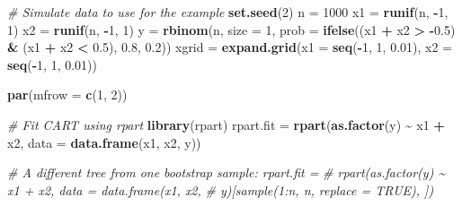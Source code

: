 \documentclass[
]{book}
\newenvironment{Shaded}{\begin{snugshade}}{\end{snugshade}}
\newcommand{\AttributeTok}[1]{\textcolor[rgb]{0.13,0.29,0.53}{#1}}
\newcommand{\CommentTok}[1]{\textcolor[rgb]{0.56,0.35,0.01}{\textit{#1}}}
\newcommand{\DecValTok}[1]{\textcolor[rgb]{0.00,0.00,0.81}{#1}}
\newcommand{\FloatTok}[1]{\textcolor[rgb]{0.00,0.00,0.81}{#1}}
\newcommand{\FunctionTok}[1]{\textcolor[rgb]{0.13,0.29,0.53}{\textbf{#1}}}
\newcommand{\NormalTok}[1]{#1}
\newcommand{\OtherTok}[1]{\textcolor[rgb]{0.56,0.35,0.01}{#1}}
\newcommand{\SpecialCharTok}[1]{\textcolor[rgb]{0.81,0.36,0.00}{\textbf{#1}}}
\begin{document}
\begin{Shaded}
\begin{Highlighting}[]
\CommentTok{\# Simulate data to use for the example}
\FunctionTok{set.seed}\NormalTok{(}\DecValTok{2}\NormalTok{)}
\NormalTok{n }\OtherTok{=} \DecValTok{1000}
\NormalTok{x1 }\OtherTok{=} \FunctionTok{runif}\NormalTok{(n, }\SpecialCharTok{{-}}\DecValTok{1}\NormalTok{, }\DecValTok{1}\NormalTok{)}
\NormalTok{x2 }\OtherTok{=} \FunctionTok{runif}\NormalTok{(n, }\SpecialCharTok{{-}}\DecValTok{1}\NormalTok{, }\DecValTok{1}\NormalTok{)}
\NormalTok{y }\OtherTok{=} \FunctionTok{rbinom}\NormalTok{(n, }\AttributeTok{size =} \DecValTok{1}\NormalTok{, }\AttributeTok{prob =} \FunctionTok{ifelse}\NormalTok{((x1 }\SpecialCharTok{+}\NormalTok{ x2 }\SpecialCharTok{\textgreater{}} \SpecialCharTok{{-}}\FloatTok{0.5}\NormalTok{) }\SpecialCharTok{\&}\NormalTok{ (x1 }\SpecialCharTok{+}
\NormalTok{    x2 }\SpecialCharTok{\textless{}} \FloatTok{0.5}\NormalTok{), }\FloatTok{0.8}\NormalTok{, }\FloatTok{0.2}\NormalTok{))}
\NormalTok{xgrid }\OtherTok{=} \FunctionTok{expand.grid}\NormalTok{(}\AttributeTok{x1 =} \FunctionTok{seq}\NormalTok{(}\SpecialCharTok{{-}}\DecValTok{1}\NormalTok{, }\DecValTok{1}\NormalTok{, }\FloatTok{0.01}\NormalTok{), }\AttributeTok{x2 =} \FunctionTok{seq}\NormalTok{(}\SpecialCharTok{{-}}\DecValTok{1}\NormalTok{, }\DecValTok{1}\NormalTok{, }\FloatTok{0.01}\NormalTok{))}

\FunctionTok{par}\NormalTok{(}\AttributeTok{mfrow =} \FunctionTok{c}\NormalTok{(}\DecValTok{1}\NormalTok{, }\DecValTok{2}\NormalTok{))}

\CommentTok{\# Fit CART using rpart}
\FunctionTok{library}\NormalTok{(rpart)}
\NormalTok{rpart.fit }\OtherTok{=} \FunctionTok{rpart}\NormalTok{(}\FunctionTok{as.factor}\NormalTok{(y) }\SpecialCharTok{\textasciitilde{}}\NormalTok{ x1 }\SpecialCharTok{+}\NormalTok{ x2, }\AttributeTok{data =} \FunctionTok{data.frame}\NormalTok{(x1,}
\NormalTok{    x2, y))}

\CommentTok{\# A different tree from one bootstrap sample: rpart.fit =}
\CommentTok{\# rpart(as.factor(y) \textasciitilde{} x1 + x2, data = data.frame(x1, x2,}
\CommentTok{\# y)[sample(1:n, n, replace = TRUE), ])}


\end{Highlighting}
\end{Shaded}
\end{document}

